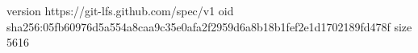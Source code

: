 version https://git-lfs.github.com/spec/v1
oid sha256:05fb60976d5a554a8caa9c35e0afa2f2959d6a8b18b1fef2e1d1702189fd478f
size 5616
